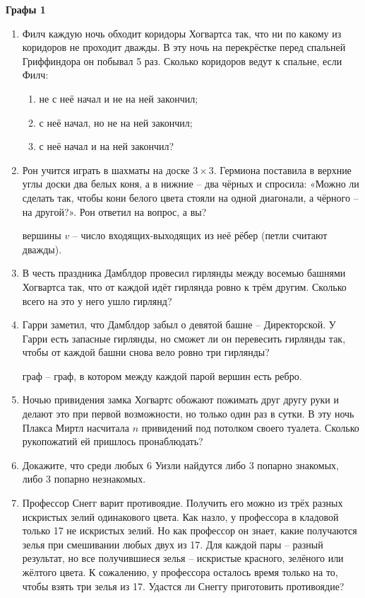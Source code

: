 \centerline{\bf \large Графы 1}
\sloppy
\begin{enumerate}
 -- абстрактный математический объект, представляющий собой множество {\it «вершин»} и
множество {\it «рёбер»}, каждое из которых соединяет пару вершин. Легко представлять граф на бумаге как
точки и линии, соединяющие их. \underline{Петля} -- ребро, соединяющее вершину саму с собой.
\underline{Кратные рёбра} -- рёбра, соединяющие одну и ту же пару вершин. Граф без петель и кратных рёбер называется
{\it простым}.
\item Филч каждую ночь обходит коридоры Хогвартса так, что ни по какому из коридоров не проходит
дважды. В эту ночь на перекрёстке перед спальней Гриффиндора он побывал 5 раз. Сколько коридоров
ведут к спальне, если Филч:
\begin{enumerate}[noitemsep]
\item не с неё начал и не на ней закончил;
\item с неё начал, но не на ней закончил;
\item с неё начал и на ней закончил?
\end{enumerate}
\item Рон учится играть в шахматы на доске $3 \times 3$. Гермиона поставила в верхние углы доски два белых
коня, а в нижние -- два чёрных и спросила: «Можно ли сделать так, чтобы кони белого цвета стояли на
одной диагонали, а чёрного -- на другой?». Рон ответил на вопрос, а вы?

 вершины $v$ -- число входящих-выходящих из неё рёбер (петли считают дважды).
\item В честь праздника Дамблдор провесил гирлянды между восемью башнями Хогвартса так, что от
каждой идёт гирлянда ровно к трём другим. Сколько всего на это у него ушло гирлянд?
\item Гарри заметил, что Дамблдор забыл о девятой башне -- Директорской. У Гарри есть запасные
гирлянды, но сможет ли он перевесить гирлянды так, чтобы от каждой башни снова вело ровно три
гирлянды?

 граф -- граф, в котором между каждой парой вершин есть ребро.
\item Ночью привидения замка Хогвартс обожают пожимать друг другу руки и делают это при первой
возможности, но только один раз в сутки. В эту ночь Плакса Миртл насчитала $n$ привидений под потолком
своего туалета. Сколько рукопожатий ей пришлось пронаблюдать?
\item Докажите, что среди любых 6 Уизли найдутся либо 3 попарно знакомых, либо 3 попарно
незнакомых.
\item Профессор Снегг варит противоядие. Получить его можно из трёх разных искристых зелий
одинакового цвета. Как назло, у профессора в кладовой только 17 не искристых зелий. Но как профессор
он знает, какие получаются зелья при смешивании любых двух из 17. Для каждой пары -- разный
результат, но все получившиеся зелья -- искристые красного, зелёного или жёлтого цвета. К сожалению,
у профессора осталось время только на то, чтобы взять три зелья из 17. Удастся ли Снеггу приготовить
противоядие?


\end{enumerate}
